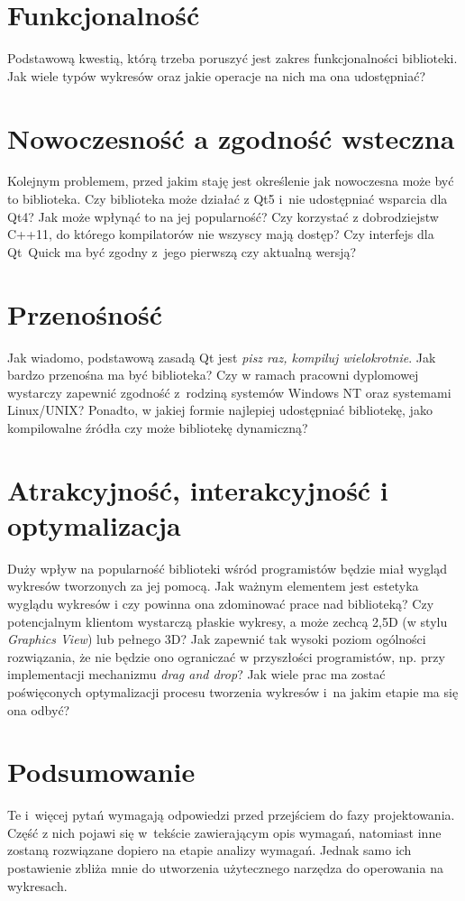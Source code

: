 \section{Funkcjonalność}
Podstawową kwestią, którą trzeba poruszyć jest zakres funkcjonalności biblioteki. Jak wiele typów wykresów oraz jakie operacje na nich ma ona udostępniać?

\section{Nowoczesność a zgodność wsteczna}
Kolejnym problemem, przed jakim staję jest określenie jak nowoczesna może być to biblioteka. Czy biblioteka może działać z Qt5 i~nie udostępniać wsparcia dla Qt4? Jak może wpłynąć to na jej popularność? Czy korzystać z dobrodziejstw C++11, do którego kompilatorów nie wszyscy mają dostęp? Czy interfejs dla Qt~Quick ma być zgodny z~jego pierwszą czy aktualną wersją?

\section{Przenośność}
Jak wiadomo, podstawową zasadą Qt jest \textit{pisz raz, kompiluj wielokrotnie}. Jak bardzo przenośna ma być biblioteka? Czy w ramach pracowni dyplomowej wystarczy zapewnić zgodność z~rodziną systemów Windows NT oraz systemami Linux/UNIX? Ponadto, w jakiej formie najlepiej udostępniać bibliotekę, jako kompilowalne źródła czy może bibliotekę dynamiczną?

\section{Atrakcyjność, interakcyjność i optymalizacja}
Duży wpływ na popularność biblioteki wśród programistów będzie miał wygląd wykresów tworzonych za jej pomocą. Jak ważnym elementem jest estetyka wyglądu wykresów i czy powinna ona zdominować prace nad biblioteką? Czy potencjalnym klientom wystarczą płaskie wykresy, a może zechcą 2,5D (w stylu \textit{Graphics View}) lub pełnego 3D? Jak zapewnić tak wysoki poziom ogólności rozwiązania, że nie będzie ono ograniczać w przyszłości programistów, np. przy implementacji mechanizmu \textit{drag and drop}?
Jak wiele prac ma zostać poświęconych optymalizacji procesu tworzenia wykresów i~na jakim etapie ma się ona odbyć?


\section{Podsumowanie}
Te i~więcej pytań wymagają odpowiedzi przed przejściem do fazy projektowania. Część z nich pojawi się w~tekście zawierającym opis wymagań, natomiast inne zostaną rozwiązane dopiero na etapie analizy wymagań. Jednak samo ich postawienie zbliża mnie do utworzenia użytecznego narzędza do operowania na wykresach.

